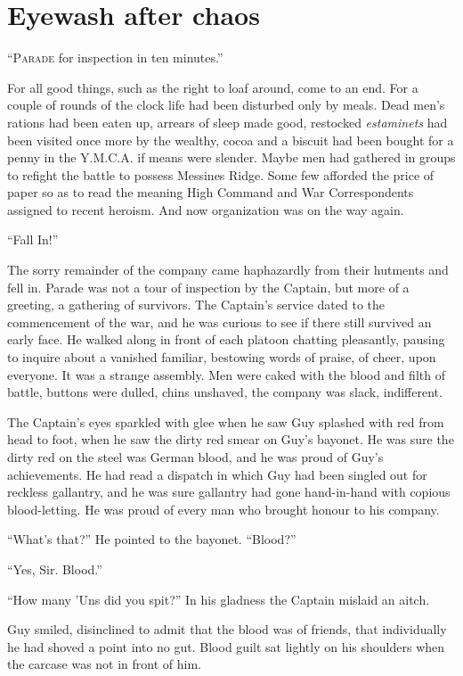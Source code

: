 \chapter*{\textsf{Eyewash after chaos}}

``P\textsc{arade} for inspection in ten minutes.''

For all good things, such as the right to loaf around, come to an end. For a couple of rounds of the clock life had been disturbed only by meals. Dead men's rations had been eaten up, arrears of sleep made good, restocked \textit{estaminets} had been visited once more by the wealthy, cocoa and a biscuit had been bought for a penny in the Y.M.C.A. if means were slender. Maybe men had gathered in groups to refight the battle to possess Messines Ridge. Some few afforded the price of paper so as to read the meaning High Command and War Correspondents assigned to recent heroism. And now organization was on the way again.

``Fall In!''

The sorry remainder of the company came haphazardly from their hutments and fell in. Parade was not a tour of inspection by the Captain, but more of a greeting, a gathering of survivors. The Captain's service dated to the commencement of the war, and he was curious to see if there still survived an early face. He walked along in front of each platoon chatting pleasantly, pausing to inquire about a vanished familiar, bestowing words of praise, of cheer, upon everyone. It was a strange assembly. Men were caked with the blood and filth of battle, buttons were dulled, chins unshaved, the company was slack, indifferent.

The Captain's eyes sparkled with glee when he saw Guy splashed with red from head to foot, when he saw the dirty red smear on Guy's bayonet. He was sure the dirty red on the steel was German blood, and he was proud of Guy's achievements. He had read a dispatch in which Guy had been singled out for reckless gallantry, and he was sure gallantry had gone hand-in-hand with copious blood-letting. He was proud of every man who brought honour to his company.

``What's that?'' He pointed to the bayonet. ``Blood?''

``Yes, Sir. Blood.''

``How many 'Uns did you spit?'' In his gladness the Captain mislaid an aitch.

Guy smiled, disinclined to admit that the blood was of friends, that individually he had shoved a point into no gut. Blood guilt sat lightly on his shoulders when the carcase was not in front of him.

